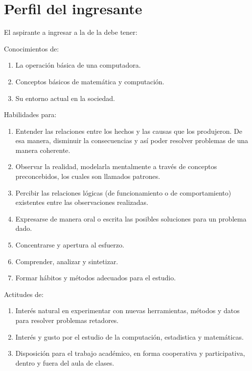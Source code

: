 \section{Perfil del ingresante}

El aspirante a ingresar a la \SchoolFullName de la \University debe tener:

\noindent Conocimientos de:
\begin{enumerate}
\item La operación básica de una computadora.
\item Conceptos básicos de matemática y computación.
\item Su entorno actual en la sociedad.
\end{enumerate}

\noindent Habilidades para:
\begin{enumerate}
\item Entender las relaciones entre los hechos y las causas que los produjeron. De esa manera, disminuir la consecuencias y así­ poder resolver problemas de una manera coherente.
\item Observar la realidad, modelarla mentalmente a través de conceptos preconcebidos, los cuales son llamados patrones.
\item Percibir las relaciones lógicas (de funcionamiento o de comportamiento) existentes entre las observaciones realizadas.
\item Expresarse de manera oral o escrita las posibles soluciones para un problema dado.
\item Concentrarse y apertura al esfuerzo.
\item Comprender, analizar y sintetizar.
\item Formar hábitos y métodos adecuados para el estudio.
\end{enumerate}

\noindent Actitudes de:
\begin{enumerate}
\item Interés natural en experimentar con nuevas herramientas, métodos y datos para resolver problemas retadores.
\item Interés y gusto por el estudio de la computación, estadistica y matemáticas.
\item Disposición para el trabajo académico, en forma cooperativa y participativa, dentro y fuera del aula de clases.
\end{enumerate}
